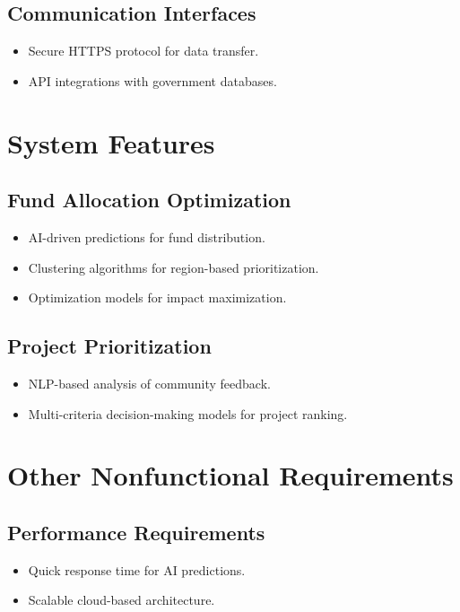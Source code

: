 \documentclass{article}
\begin{document}
\subsection{Communication Interfaces}
\begin{itemize}
    \item Secure HTTPS protocol for data transfer.
    \item API integrations with government databases.
\end{itemize}

\newpage
\section{System Features}
\subsection{Fund Allocation Optimization}
\begin{itemize}
    \item AI-driven predictions for fund distribution.
    \item Clustering algorithms for region-based prioritization.
    \item Optimization models for impact maximization.
\end{itemize}

\subsection{Project Prioritization}
\begin{itemize}
    \item NLP-based analysis of community feedback.
    \item Multi-criteria decision-making models for project ranking.
\end{itemize}

\newpage
\section{Other Nonfunctional Requirements}
\subsection{Performance Requirements}
\begin{itemize}
    \item Quick response time for AI predictions.
    \item Scalable cloud-based architecture.
\end{itemize}
\end{document}
